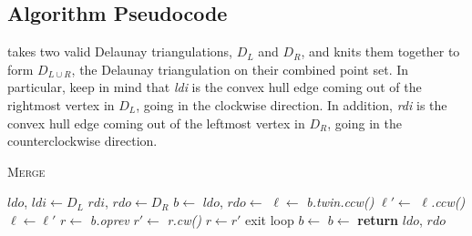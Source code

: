 \documentclass[12pt,twoside]{reedthesis}
\begin{document}
    \subsection{Algorithm Pseudocode} %
    \label{sub:algorithm_pseudocode}
       takes two valid Delaunay triangulations, $D_{L}$ and $D_{R}$, and knits them together to form $D_{L \cup R}$, the Delaunay triangulation on their combined point set. In particular, keep in mind that \textit{ldi} is the convex hull edge coming out of the rightmost vertex in $D_{L}$, going in the clockwise direction. In addition, \textit{rdi} is the convex hull edge coming out of the leftmost vertex in $D_{R}$, going in the counterclockwise direction. \par

      \begin{algorithm}[H]
        \caption{\textsc{Merge}}\label{del_merge}
        \begin{algorithmic}[1]
        \State $ldo$, $ldi\gets D_{L}$
        \State $rdi$, $rdo\gets D_{R}$
        \State $b\gets$ \label{lct}
        \State $ldo$, $rdo\gets$ 
        \Loop \label{rb} 
          \State $\ell\gets$ \textit{b.twin.ccw()}
           \label{valid_l}
            \label{rm_l}
              \State $\ell' \gets$ \textit{$\ell$.ccw()}
              \State {}
              \State $\ell \gets \ell'$
            \EndWhile
          \EndIf
          \State $r \gets$ \textit{b.oprev}
            \label{rm_r}
              \State $r' \gets$ \textit{r.cw()}
              \State {}
              \State $r \gets r'$
            \EndWhile
          \EndIf
           \label{ce}
            \State exit loop
          \EndIf
          \label{ce_1}
            \State $b\gets$  \label{ce_add1}
          \Else
            \State $b\gets$  \label{ce_add2}
          \EndIf
        \EndLoop \label{rb_end}
        \State \textbf{return} $ldo$, $rdo$
        \EndProcedure
        \end{algorithmic} 
        \end{algorithm}
\end{document}
